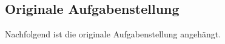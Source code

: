 %

\subsection{Originale Aufgabenstellung}\label{aufgabenstellung}

Nachfolgend ist die originale Aufgabenstellung angehängt.


